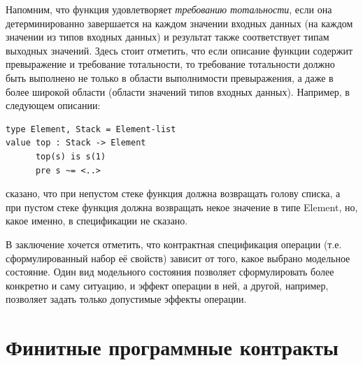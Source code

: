 \documentclass[14pt, twoside]{extreport}
\begin{document}
Напомним, что функция удовлетворяет \emph{требованию тотальности}, если она детерминированно завершается на каждом значении входных данных (на каждом значении из типов входных данных) и результат также соответствует типам выходных значений. Здесь стоит отметить, что если описание функции содержит превыражение и требование тотальности, то требование тотальности должно быть выполнено не только в области выполнимости превыражения, а даже в более широкой области (области значений типов входных данных). Например, в следующем описании:
\begin{lstlisting}
type Element, Stack = Element-list
value top : Stack -> Element
      top(s) is s(1)
      pre s ~= <..>
\end{lstlisting}
сказано, что при непустом стеке функция должна возвращать голову списка, а при пустом стеке функция должна возвращать некое значение в типе Element, но, какое именно, в спецификации не сказано.

В заключение хочется отметить, что контрактная спецификация операции (т.е. сформулированный набор её свойств) зависит от того, какое выбрано модельное состояние. Один вид модельного состояния позволяет сформулировать более конкретно и саму ситуацию, и эффект операции в ней, а другой, например, позволяет задать только допустимые эффекты операции.



\section{Финитные программные контракты}
\end{document}
